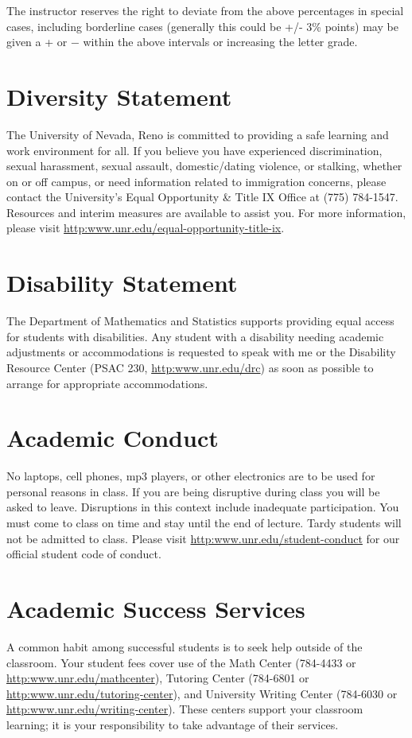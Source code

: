 \documentclass[11pt,onecolumn]{article}
\begin{document}
The instructor reserves the right to deviate from the above percentages in special cases, including borderline cases (generally this could be +/- 3\% points) may be given a + or − within the above intervals or increasing the letter grade.

\section*{Diversity Statement}
The University of Nevada, Reno is committed to providing a safe learning and work environment for all. If you believe you have experienced discrimination, sexual harassment, sexual assault, domestic/dating violence, or stalking, whether on or off campus, or need information related to immigration concerns, please contact the University’s Equal Opportunity \& Title IX Office at (775) 784-1547. Resources and interim measures are available to assist you. For more information, please visit \url{http:www.unr.edu/equal-opportunity-title-ix}.

\section*{Disability Statement}
The Department of Mathematics and Statistics supports providing equal access for students with disabilities. Any student with a disability needing academic adjustments or accommodations is requested to speak with me or the Disability Resource Center (PSAC 230, \url{http:www.unr.edu/drc}) as soon as possible to arrange for appropriate accommodations.

\section*{Academic Conduct}
No laptops, cell phones, mp3 players, or other electronics are to be used for personal reasons in class. If you are being disruptive during class you will be asked to leave. Disruptions in this context include inadequate participation. You must come to class on time and stay until the end of lecture. Tardy students will not be admitted to class. Please visit \url{http:www.unr.edu/student-conduct} for our official student code of conduct.

\section*{Academic Success Services}
A common habit among successful students is to seek help outside of the classroom. Your student fees cover use of the Math Center (784-4433 or \url{http:www.unr.edu/mathcenter}), Tutoring Center (784-6801 or \url{http:www.unr.edu/tutoring-center}), and University Writing Center (784-6030 or \url{http:www.unr.edu/writing-center}). These centers support your classroom learning; it is your responsibility to take advantage of their services.
\end{document}
